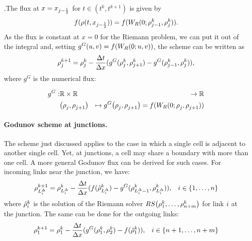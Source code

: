 .The flux at $x=x_{j-\frac{1}{2}}$ for $t\in(t^{k},t^{k+1})$
is given by 
\[
f(\rho(t,x_{j-\frac{1}{2}}))=f(W_{R}(0;\rho_{j-1}^{k},\rho_{j}^{k})).
\]
As the flux is constant at $x=0$ for the Riemann problem, we can
put it out of the integral and, setting $g^{G}(u,v)=f(W_{R}(0;u,v))$,
the scheme can be written as 
\begin{equation}
\rho_{j}^{k+1}=\rho_{j}^{k}-\frac{\Delta t}{\Delta x}(g^{G}(\rho_{j}^{k},\rho_{j+1}^{k})-g^{G}(\rho_{j-1}^{k},\rho_{j}^{k})),\label{eq:godscheme}
\end{equation}
where $g^{G}$ is the numerical flux:

\begin{eqnarray*}
\god: & \mathbb{R}\times\mathbb{R} & \rightarrow\mathbb{R}\\
 & \left(\discrete{\xind}{},\discrete{\xind+1}{}\right) & \mapsto\god\left(\discrete{\xind}{},\discrete{\xind+1}{}\right)=f(W_{R}(0;\discrete{\xind}{},\discrete{\xind+1}{}))
\end{eqnarray*}



\paragraph{Godunov scheme at junctions.\label{par:Godunov-scheme-at}}

The scheme just discussed applies to the case in which a single cell
is adjacent to another single cell. Yet, at junctions, a cell may
share a boundary with more than one cell. A more general Godunov flux
can be derived for such cases. For incoming links near the junction,
we have: 
\begin{align*}
\discrete{\length_{\link}^{\Delta}}{\tind+1}=\discrete{\length_{\link}^{\Delta}}{\tind}-\dfrac{\Delta t}{\Delta x}(f(\trace{\dvar}_{\length_{\link}^{\Delta}}^{\tind})-\god(\discrete{L_{i}^{\Delta}-1}{\tind},\discrete{L_{i}^{\Delta}}{\tind})), &  & \link\in\left\{ 1,\ldots,\ninc\right\} 
\end{align*}
where $\hat{\rho}_{i}^{k}$ is the solution of the Riemann solver
$\RS\tuple{\discrete 1{\tind}}{\discrete{\ninc+\nout}{\tind}}$ for
link $i$ at the junction. The same can be done for the outgoing
links: 
\begin{align*}
\discrete 1{\tind+1}=\discrete 1{\tind}-\dfrac{\Delta t}{\Delta x}(\god(\discrete 1{\tind},\discrete 2{\tind})-f(\trace{\dvar}_{1}^{\tind})), &  & \link\in\left\{ \ninc+1,\ldots,\ninc+\nout\right\} 
\end{align*}

